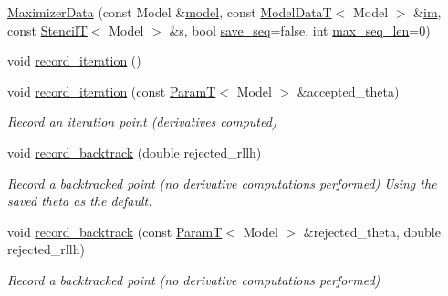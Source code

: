 \begin{DoxyCompactItemize}
\item 
\hyperlink{classmappel_1_1IterativeMaximizer_1_1MaximizerData_aa14baec5beb341270a0f09f0d3ff5481}{Maximizer\+Data} (const Model \&\hyperlink{classmappel_1_1Estimator_a8322546d87ccdf01f8b0dcd9dae509f0}{model}, const \hyperlink{namespacemappel_a97f050df953605381ae9c901c3b125f1}{Model\+DataT}$<$ Model $>$ \&\hyperlink{classmappel_1_1IterativeMaximizer_1_1MaximizerData_afcee3fa283be1a9ba1d197ed777d447c}{im}, const \hyperlink{namespacemappel_a3a06598240007876f8c4bf834ad86197}{StencilT}$<$ Model $>$ \&s, bool \hyperlink{classmappel_1_1IterativeMaximizer_1_1MaximizerData_af13babebeb16147883db7af0b4875b53}{save\+\_\+seq}=false, int \hyperlink{classmappel_1_1IterativeMaximizer_1_1MaximizerData_aee106ddaebe30496f5280095fc01301a}{max\+\_\+seq\+\_\+len}=0)
\item 
void \hyperlink{classmappel_1_1IterativeMaximizer_1_1MaximizerData_a1096048bf29ccbc45e4a60dc6cbf7b2c}{record\+\_\+iteration} ()
\item 
void \hyperlink{classmappel_1_1IterativeMaximizer_1_1MaximizerData_a9eca9cd87534fa88ff6b1116853123d0}{record\+\_\+iteration} (const \hyperlink{namespacemappel_a667925cb0d6c0e49f2f035cc5a9a6857}{ParamT}$<$ Model $>$ \&accepted\+\_\+theta)
\begin{DoxyCompactList}\small\item\em Record an iteration point (derivatives computed) \end{DoxyCompactList}\item 
void \hyperlink{classmappel_1_1IterativeMaximizer_1_1MaximizerData_a8c82784b23315be8f74b968ee4188388}{record\+\_\+backtrack} (double rejected\+\_\+rllh)
\begin{DoxyCompactList}\small\item\em Record a backtracked point (no derivative computations performed) Using the saved theta as the default. \end{DoxyCompactList}\item 
void \hyperlink{classmappel_1_1IterativeMaximizer_1_1MaximizerData_ae60e71250e72ce3ce5cad912df8f16cf}{record\+\_\+backtrack} (const \hyperlink{namespacemappel_a667925cb0d6c0e49f2f035cc5a9a6857}{ParamT}$<$ Model $>$ \&rejected\+\_\+theta, double rejected\+\_\+rllh)
\begin{DoxyCompactList}\small\item\em Record a backtracked point (no derivative computations performed) \end{DoxyCompactList}\item 

\end{DoxyCompactItemize}
